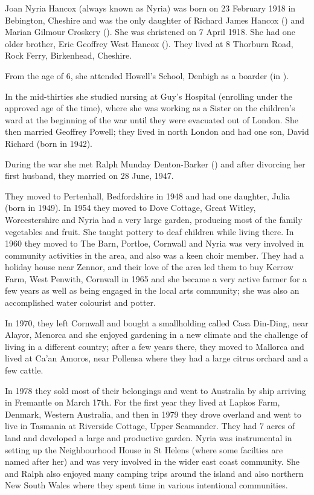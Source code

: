 
Joan Nyria Hancox (always known as Nyria) was born on 23 February 1918 in Bebington, Cheshire\cite{BMDIndex_JoanNyriaHancox_birth} and was the only daughter of Richard James Hancox ()  and Marian Gilmour Croskery ().\cite{NyriaBirth} She was christened on 7 April 1918.\cite{NyriaChristening} She had one older brother, Eric Geoffrey West Hancox ().  They lived at 8 Thorburn Road, Rock Ferry, Birkenhead, Cheshire. 

From the age of 6, she attended Howell's School, Denbigh as a boarder (in ).\cite{OralHistoryJDB2008}

In the mid-thirties she studied nursing at Guy's Hospital (enrolling under the approved age of the time),  where she was working  as a Sister on the children's ward at the beginning of the war until they were evacuated out of London. She then married Geoffrey Powell; they lived in north London and had one son, David Richard (born in 1942).

During the war she met Ralph Munday Denton-Barker () and after divorcing her first husband, they married on 28 June, 1947.\cite{MarriageCertRalphDentonBarkerJoanNyriaPowell}

They moved to Pertenhall, Bedfordshire in 1948 and had one daughter, Julia (born in 1949).  In 1954 they moved to Dove Cottage, Great Witley, Worcestershire and Nyria had a very large garden, producing most of the family vegetables and fruit. She taught pottery to deaf children while living there.  In 1960 they moved to The Barn, Portloe, Cornwall and Nyria was very involved in community activities in the area, and also was a keen choir member.  They had a holiday house near Zennor, and their love of the area led them to buy Kerrow Farm, West Penwith, Cornwall in 1965 and she became a very active farmer for a few years as well as being engaged in the local arts community; she was also an accomplished water colourist and potter.

In 1970, they left Cornwall and  bought a smallholding called Casa Din-Ding, near Alayor, Menorca and she enjoyed  gardening in  a new climate and the challenge of living in a different country;  after a few years there, they moved to Mallorca and lived at Ca'an Amoros, near Pollensa where they had a large citrus orchard and a few cattle.  

In 1978 they sold most of their belongings and went to Australia by ship arriving in Fremantle on March 17th.  For the first year they lived at Lapkos Farm, Denmark, Western Australia, and then in 1979 they drove overland and went to live in Tasmania at Riverside Cottage, Upper Scamander. They had 7 acres of land and developed a large and productive garden. Nyria was instrumental in setting up the Neighbourhood House in St Helens (where some facilties are named after her)  and was very involved in the wider east coast community.  She and Ralph also enjoyed many camping trips around the island and also northern New South Wales where they spent time in various intentional communities. 

